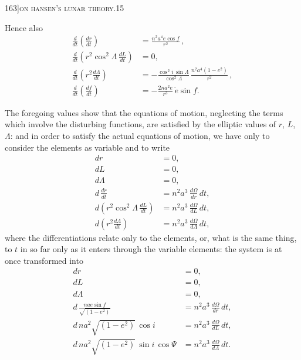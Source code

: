 \documentclass[11pt]{article}
\begin{document}
\newpage

\begin{center}
\small 163]\hfill\textsc{on hansen's lunar theory.}\hfill\textsc{15}
\end{center}

\medskip

\noindent Hence also
\begin{align*}
\frac{d}{dt}\!\left(\frac{dr}{dt}\right) &= \frac{n^{2}a^{4}e\cos f}{r^{2}}\,,\\
\frac{d}{dt}\!\left(r^{2}\cos^{2}\Lambda\,\frac{dL}{dt}\right) &= 0,\\
\frac{d}{dt}\!\left(r^{2}\frac{d\Lambda}{dt}\right) &= -\frac{\cos^{2}i\,\sin\Lambda}{\cos^{2}\Lambda}\,\frac{n^{2}a^{4}(1-e^{2})}{r^{2}}\,,\\
\frac{d}{dt}\!\left(\frac{df}{dt}\right) &= -\frac{2na^{2}e}{r^{3}}\,\dot{e}\sin f.
\end{align*}

The foregoing values show that the equations of motion, neglecting the terms which
involve the disturbing functions, are satisfied by the elliptic values of $r$, $L$, $\Lambda$: and
in order to satisfy the actual equations of motion, we have only to consider the
elements as variable and to write
\begin{align*}
dr &= 0,\\
dL &= 0,\\
d\Lambda &= 0,\\
d\,\frac{dr}{dt} &= n^{2}a^{3}\,\frac{d\Omega}{dr}\,dt,\\
d\!\left(r^{2}\cos^{2}\Lambda\,\frac{dL}{dt}\right) &= n^{2}a^{3}\,\frac{d\Omega}{dL}\,dt,\\
d\!\left(r^{2}\frac{d\Lambda}{dt}\right) &= n^{2}a^{3}\,\frac{d\Omega}{d\Lambda}\,dt,
\end{align*}
where the differentiations relate only to the elements, or, what is the same thing, to $t$
in so far only as it enters through the variable elements: the system is at once
transformed into
\begin{align*}
dr &= 0,\\
dL &= 0,\\
d\Lambda &= 0,\\
d\,\frac{na e\sin f}{\sqrt{(1-e^{2})}} &= n^{2}a^{3}\,\frac{d\Omega}{dr}\,dt,\\
d\,na^{2}\sqrt{(1-e^{2})}\,\cos i &= n^{2}a^{3}\,\frac{d\Omega}{dL}\,dt,\\
d\,na^{2}\sqrt{(1-e^{2})}\,\sin i\,\cos\Psi &= n^{2}a^{3}\,\frac{d\Omega}{d\Lambda}\,dt.
\end{align*}
\end{document}
